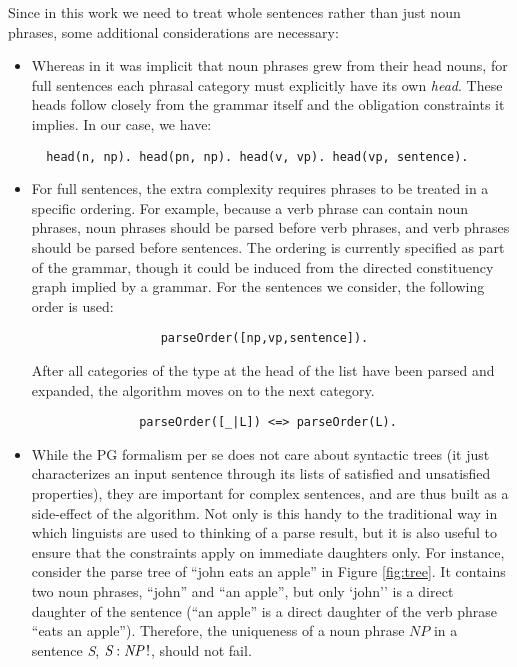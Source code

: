 \documentclass{llncs}
\newcommand{\uniqueness}[2]{\textit{#1} : \textit{#2}\,!}
\newcommand{\NP}{\textit{NP}\xspace}
\newcommand{\Se}{\textit{S}\xspace}
\begin{document}
Since in this work we need to treat whole sentences rather than just noun phrases, some additional considerations are necessary:
\begin{itemize}
  \item Whereas in \cite {DM12} it was implicit that noun phrases grew from their head nouns, for full sentences each phrasal category must explicitly have its own \emph{head}. These heads follow closely from the grammar itself and the obligation constraints it implies. In our case, we have:
\begin{verbatim}  head(n, np). head(pn, np). head(v, vp). head(vp, sentence).\end{verbatim}
  
  \item For full sentences, the extra complexity requires phrases to be treated in a specific ordering. For example, because a verb phrase can contain noun phrases, noun phrases should be parsed before verb phrases, and verb phrases should be parsed before sentences. The ordering is currently specified as part of the grammar, though it could be induced from the directed constituency graph implied by a grammar. For the sentences we consider, the following order is used:
\begin{verbatim}                  parseOrder([np,vp,sentence]).\end{verbatim}

After all categories of the type at the head of the list have been parsed and expanded, the algorithm moves on to the next category.
\begin{verbatim}               parseOrder([_|L]) <=> parseOrder(L).
\end{verbatim}
  
  \item While the PG formalism per se does not care about syntactic trees (it just characterizes an input sentence through its lists of satisfied and unsatisfied properties), they are important for complex sentences, and are thus built as a side-effect of the algorithm. Not only is this handy to the traditional way in which linguists are used to thinking of a parse result, but it is also useful to ensure that the constraints apply on immediate daughters only. For instance, consider the parse tree of ``john eats an apple'' in Figure \ref{fig:tree}. It contains two noun phrases, ``john'' and ``an apple'', but only `john'' is a direct daughter of the sentence (``an apple'' is a direct daughter of the verb phrase ``eats an apple''). Therefore, the uniqueness of a noun phrase $\NP$ in a sentence \Se, $\uniqueness{\Se}{\NP}$, should not fail.


\end{itemize}
\end{document}
